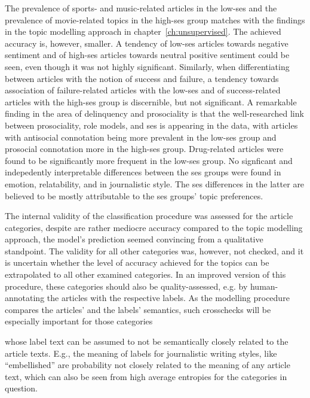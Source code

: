The prevalence of sports- and music-related articles in the low-\gls{ses} and the prevalence of movie-related topics in the high-\gls{ses} group matches with the findings in the topic modelling approach in chapter~\ref{ch:unsupervised}. The achieved accuracy is, however, smaller. A tendency of low-\gls{ses} articles towards negative sentiment and of high-\gls{ses} articles towards neutral positive sentiment could be seen, even though it was not highly significant. Similarly, when differentiating between articles with the notion of success and failure, a tendency towards association of failure-related articles with the low-\gls{ses} and of success-related articles with the high-\gls{ses} group is discernible, but not significant. A remarkable finding in the area of delinquency and prosociality is that the well-researched link between prosociality, role models, and \gls{ses} is appearing in the data, with articles with antisocial connotation being more prevalent in the low-\gls{ses} group and prosocial connotation more in the high-\gls{ses} group. Drug-related articles were found to be significantly more frequent in the low-\gls{ses} group. No signficant and indepedently interpretable differences between the \gls{ses} groups were found in emotion, relatability, and in journalistic style. The \gls{ses} differences in the latter are believed to be mostly attributable to the \gls{ses} groups' topic preferences.

The internal validity of the classification procedure was assessed for the article categories, despite are rather mediocre accuracy compared to the topic modelling approach, the model's prediction seemed convincing from a qualitative standpoint. The validity for all other categories was, however, not checked, and it is uncertain whether the level of accuracy achieved for the topics can be extrapolated to all other examined categories. In an improved version of this procedure, these categories should also be quality-assessed, e.g. by human-annotating the articles with the respective labels. As the modelling procedure compares the articles' and the labels' semantics, such crosschecks will be especially important for those categories 

whose label text can be assumed to not be semantically closely related to the article texts. E.g., the meaning of labels for journalistic writing styles, like ``embellished'' are probability not closely related to the meaning of any article text, which can also be seen from high average entropies for the categories in question.






